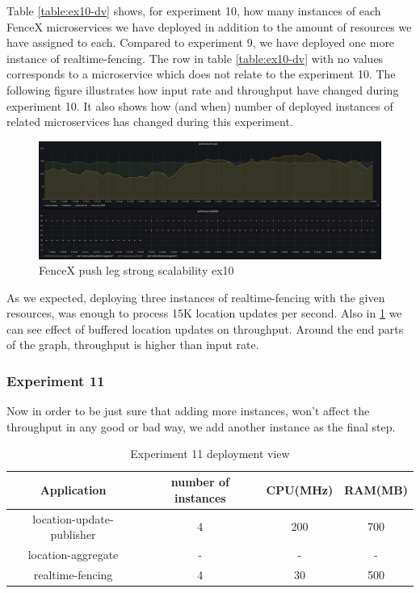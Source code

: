 \documentclass[a4]{report}
\begin{document}
    Table \ref{table:ex10-dv} shows, for experiment 10, how many instances of each FenceX microservices we have
    deployed in addition to the amount of resources we have assigned to each.
    Compared to experiment 9, we have deployed one more instance of realtime-fencing.
    The row in table \ref{table:ex10-dv} with no values corresponds to a microservice which does not relate to the
    experiment 10.
    The following figure illustrates how input rate and throughput have changed during experiment 10.
    It also shows how (and when) number of deployed instances of related microservices has changed during this
    experiment.

    \begin{figure}[h!]
        \centering
        \caption{FenceX push leg strong scalability ex10}
        \label{fig:ex10}
        \includegraphics[width=\linewidth, scale=2]{images/evaluation/ex10-benchmarking-ongoing-2per4sec.png}
    \end{figure}

    As we expected, deploying three instances of realtime-fencing with the given resources, was enough to process 15K
    location updates per second.
    Also in \ref{fig:ex10} we can see effect of buffered location updates on throughput.
    Around the end parts of the graph, throughput is higher than input rate.

    \clearpage

    \subsubsection{Experiment 11}
    Now in order to be just sure that adding more instances, won't affect the throughput in any good or bad way, we
    add another instance as the final step.

    \begin{table}[h!]
        \centering
        \begin{tabular}{|c|c|c|c|}
            \hline
            Application               & number of instances & CPU(MHz) & RAM(MB) \\
            \hline
            location-update-publisher & 4                   & 200      & 700     \\
            location-aggregate        & -                   & -        & -       \\
            realtime-fencing          & 4                   & 30       & 500     \\
            \hline
        \end{tabular}
        \caption{Experiment 11 deployment view}
        \label{table:ex11-dv}
    \end{table}
\end{document}
